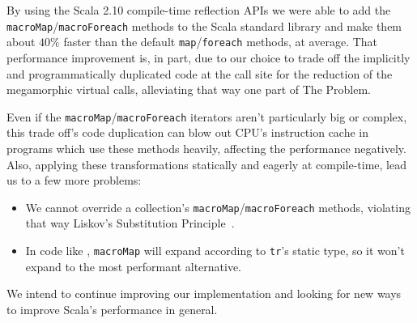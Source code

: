 \label{conclusions}

By using the Scala 2.10 compile-time reflection APIs we were able to add the \texttt{macroMap}/\texttt{macroForeach} methods to the Scala standard library and make them about $40\%$ faster than the default \texttt{map}/\texttt{foreach} methods, at average. That performance improvement is, in part, due to our choice to trade off the implicitly and programmatically duplicated code at the call site for the reduction of the megamorphic virtual calls, alleviating that way one part of The Problem.

Even if the \texttt{macroMap}/\texttt{macroForeach} iterators aren't particularly big or complex, this trade off's code duplication can blow out CPU's instruction cache in programs which use these methods heavily, affecting the performance negatively. Also, applying these transformations statically and eagerly at compile-time, lead us to a few more problems:

\begin{itemize}
 \item We cannot override a collection's \texttt{macroMap}/\texttt{macroForeach} methods, violating that way Liskov's Substitution Principle~\cite{liskov1994behavioral}.
 \item In code like , \texttt{macroMap} will expand according to \texttt{tr}'s static type, so it won't expand to the most performant alternative.
\end{itemize}

We intend to continue improving our implementation and looking for new ways to improve Scala's performance in general.
